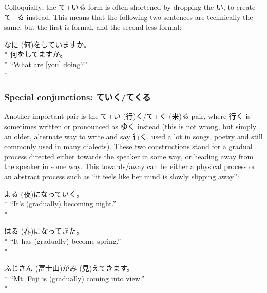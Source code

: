 \documentclass[11pt, b5paper, twoside, openright, onecolumn]{book}
\makeatletter
\newcommand*{\rubystack}[2]{{\relscale{0.5}%
  \begin{tabular}[b]{@{}c@{}}%
    {#1}\\%
   {\textscale{2}{#2}}%
  \end{tabular}}%
}
\DeclareRobustCommand*{\ruby}[2]{%
  \mbox{%
    \setlength{\parskip}{0ex}%
    \BeginAccSupp{method=pdfstringdef,ActualText={#1}}%
      \rubystack{\phantom{#2}}{#1}%
      \llap{%
        \rubystack{#2}{\phantom{#1}}%
      }%
    \EndAccSupp{}%
  }%
}
\renewcommand*{\ruby}[2]{#2 (#1)}%
\newenvironment{exampleblock}{
\setlength{\parindent}{0.6in}
\begin{minipage}[t]{\dimexpr\textwidth-\parindent}}
{\end{minipage}}
\makeatother
\begin{document}
Colloquially‚ the て+いる form is often shortened by dropping the い‚ to create て+る instead. This means that the following two sentences are technically the same‚ but the first is formal‚ and the second less formal:

\vspace{0.4cm}
\begin{exampleblock}
\ruby{何}{なに}をしていますか。 \\* 
何をしてますか。 \\* 
“What are [you] doing?” \\* 
\end{exampleblock}
\subsubsection{Special conjunctions: ていく/てくる}


Another important pair is the て+\ruby{行}{い}く/て+\ruby{来}{く}る pair‚ where 行く is sometimes written or pronounced as ゆく instead (this is not wrong‚ but simply an older‚ alternate way to write and say 行く‚ used a lot in songs‚ poetry and still commonly used in many dialects). These two constructions stand for a gradual process directed either towards the speaker in some way‚ or heading away from the speaker in some way. This towards/away can be either a physical process or an abstract process such as “it feels like her mind is slowly slipping away”:

\vspace{0.4cm}
\begin{exampleblock}
\ruby{夜}{よる}になっていく。 \\* 
“It’s (gradually) becoming night.” \\* 
\end{exampleblock}
\vspace{0.2cm}

\begin{exampleblock}
\ruby{春}{はる}になってきた。 \\* 
“It has (gradually) become spring.” \\* 
\end{exampleblock}
\vspace{0.2cm}

\begin{exampleblock}
\ruby{富士山}{ふじさん}が\ruby{見}{み}えてきます。 \\* 
“Mt. Fuji is (gradually) coming into view.” \\* 
\end{exampleblock}
\vspace{0.2cm}
\end{document}
